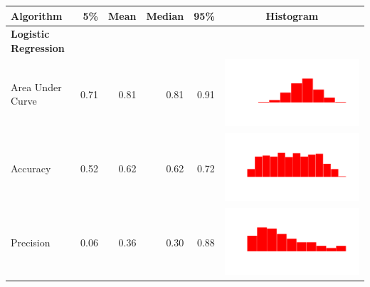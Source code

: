\documentclass[conference]{IEEEtran}
\begin{document}
\begin{table}
  \begin{tabular}{lrrrrc}
    \hline
    \textbf{Algorithm} & \textbf{5\%} & \textbf{Mean} & \textbf{Median} & \textbf{95\%} & \textbf{Histogram} \\
    \hline

    \bf{Logistic Regression}\\
    Area Under Curve & 0.71 & 0.81 & 0.81 & 0.91 & \includegraphics[scale = 0.1, clip = true, trim= 50px 60px 50px 60px]{../figs/hist-results/hist-LRauc.pdf} \\
    Accuracy & 0.52 & 0.62 & 0.62 & 0.72 & \includegraphics[scale = 0.1, clip = true, trim= 50px 60px 50px 60px]{../figs/hist-results/hist-LRacc.pdf} \\
    Precision & 0.06 & 0.36 & 0.30 & 0.88 & \includegraphics[scale = 0.1, clip = true, trim= 50px 60px 50px 60px]{../figs/hist-results/hist-LRprec.pdf} \\

\end{tabular}
\end{table}
\end{document}
